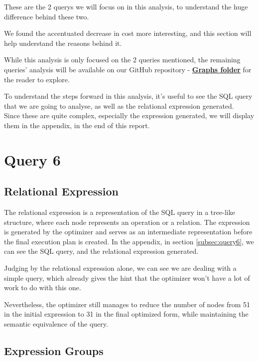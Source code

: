 \documentclass[a4paper,12pt]{scrreprt}
\begin{document}
These are the 2 querys we will focus on in this analysis, to understand the huge difference behind these two.

We found the accentuated decrease in cost more interesting, and this section will help understand the reasons behind it. 

While this analysis is only focused on the 2 queries mentioned, the remaining queries' analysis will be available on our GitHub repository - \textbf{\href{https://github.com/Blackparkd/risinglight/tree/main/src/planner/outputs/graphs}{Graphs folder}} for the reader to explore. 

To understand the steps forward in this analysis, it's useful to see the SQL query that we are going to analyse, as well as the relational expression generated. \\
Since these are quite complex, especially the expression generated, we will display them in the appendix, in the end of this report.

\section{Query 6}

\subsection{Relational Expression}

The relational expression is a representation of the SQL query in a tree-like structure, where each node represents an operation or a relation. The expression is generated by the optimizer and serves as an intermediate representation before the final execution plan is created.
In the appendix, in section \underline{\hyperref[subsec:query6]{\ref{subsec:query6}}}, we can see the SQL query, and the relational expression generated. 

Judging by the relational expression alone, we can see we are dealing with a simple query, which already gives the hint that the optimizer won't have a lot of work to do with this one.

Nevertheless, the optimizer still manages to reduce the number of nodes from 51 in the initial expression to 31 in the final optimized form, while maintaining the semantic equivalence of the query. 

\subsection{Expression Groups}
\end{document}
